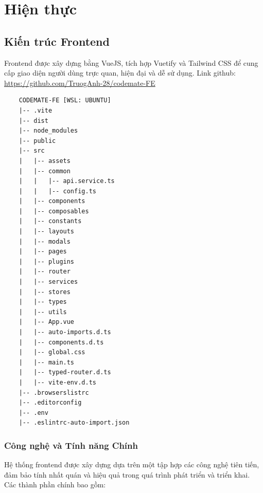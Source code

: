 \chapter{Hiện thực}

\section{Kiến trúc Frontend}

Frontend được xây dựng bằng VueJS, tích hợp Vuetify và Tailwind CSS để cung cấp giao diện người dùng trực quan, hiện đại và dễ sử dụng.
Link github: \href{https://github.com/TruogAnh-28/codemate-FE}{https://github.com/TruogAnh-28/codemate-FE}

\begin{verbatim}
    CODEMATE-FE [WSL: UBUNTU]
    |-- .vite
    |-- dist
    |-- node_modules
    |-- public
    |-- src
    |   |-- assets
    |   |-- common
    |   |   |-- api.service.ts
    |   |   |-- config.ts
    |   |-- components
    |   |-- composables
    |   |-- constants
    |   |-- layouts
    |   |-- modals
    |   |-- pages
    |   |-- plugins
    |   |-- router
    |   |-- services
    |   |-- stores
    |   |-- types
    |   |-- utils
    |   |-- App.vue
    |   |-- auto-imports.d.ts
    |   |-- components.d.ts
    |   |-- global.css
    |   |-- main.ts
    |   |-- typed-router.d.ts
    |   |-- vite-env.d.ts
    |-- .browserslistrc
    |-- .editorconfig
    |-- .env
    |-- .eslintrc-auto-import.json
    \end{verbatim}

\subsection*{Công nghệ và Tính năng Chính}

Hệ thống frontend được xây dựng dựa trên một tập hợp các công nghệ tiên tiến, đảm bảo tính nhất quán và hiệu quả trong quá trình phát triển và triển khai. Các thành phần chính bao gồm:

